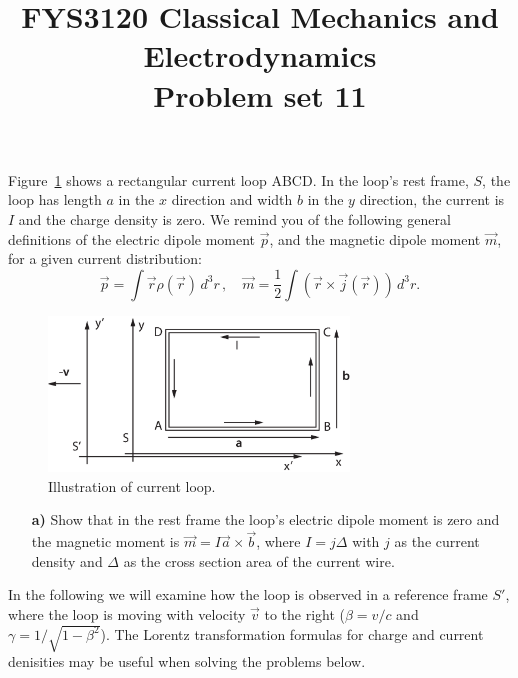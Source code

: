 \documentclass[11pt,a4paper]{report}
\title{FYS3120 Classical Mechanics and Electrodynamics\\ 
\vspace{15mm}Problem set 11}
\newcounter{excount}[chapter]
\newenvironment{exercise}[1][]{\addtocounter{excount}{1} \noindent {\bf Problem
    \arabic{excount} \ \ #1}\hspace{2mm}}{\vspace{4mm}}
\begin{document}
\maketitle


\begin{exercise}
Figure~\ref{fig:currentloop} shows a rectangular current loop ABCD. In the loop's rest frame, $S$, the loop has length $a$ in the $x$ direction and width $b$ in the $y$ direction, the current is $I$ and the charge density is zero. We remind you of the following general definitions of the electric dipole moment $\vec p$, and the magnetic dipole moment $\vec m$, for a given current distribution:
\begin{equation}
\vec p=\int\vec r\rho(\vec r)\,d^3r\,,\quad\vec m=\frac{1}{2}\int(\vec r\times \vec j(\vec r))\,d^3r.
\end{equation}

\begin{figure}[h]
\begin{center}
\includegraphics[width=8cm]{currentloop.eps}
\end{center}
\caption{Illustration of current loop. \label{fig:currentloop}}
\end{figure}

\begin{itemize}
\item[{\bf a)}] Show that in the rest frame the loop's electric dipole moment is zero and the magnetic moment is $\vec m=I\vec a\times \vec b$, where $I=j\Delta$ with $j$ as the current density and $\Delta$ as the cross section area of the current wire.
\end{itemize}

In the following we will examine how the loop is observed in a reference frame $S'$, where the loop is moving with velocity $\vec v$ to the right ($\beta=v/c$ and $\gamma=1/\sqrt{1-\beta^2}$). The Lorentz transformation formulas for charge and current denisities may be useful when solving the problems below.


\end{exercise}
\end{document}
